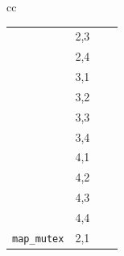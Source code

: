 \begin{table}[t]
\begin{center}
\begin{tabular}{cc}
\begin{tabular}{cc||r|r}
			& 2,3 & \cpu{2.45} & \ints{3} \\
			& 2,4 & \cpu{2.41} & \ints{3} \\
			& 3,1 & \cpu{2.69} & \ints{12} \\
			& 3,2 & \cpu{2.67} & \ints{12} \\
			& 3,3 & \cpu{2.76} & \ints{13} \\
			& 3,4 & \cpu{2.74} & \ints{13} \\
			& 4,1 & \cpu{4.03} & \ints{60} \\
			& 4,2 & \cpu{4.34} & \ints{66} \\
			& 4,3 & \cpu{4.53} & \ints{71} \\
			& 4,4 & \cpu{4.75} & \ints{73} \\
			\cline{1-4}
			{\tt map\_mutex}
			& 2,1 & \\ %

\end{tabular}
\end{tabular}
\end{center}
\end{table}
